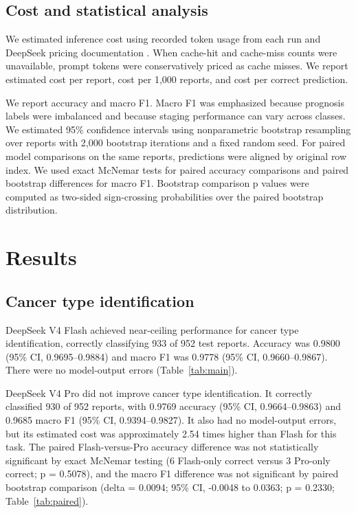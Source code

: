 \documentclass[pdflatex,sn-vancouver-num]{sn-jnl}
\begin{document}
\subsection{Cost and statistical analysis}\label{subsec:stats}

We estimated inference cost using recorded token usage from each run and DeepSeek pricing documentation \cite{deepseekpricing}. When cache-hit and cache-miss counts were unavailable, prompt tokens were conservatively priced as cache misses. We report estimated cost per report, cost per 1,000 reports, and cost per correct prediction.

We report accuracy and macro F1. Macro F1 was emphasized because prognosis labels were imbalanced and because staging performance can vary across classes. We estimated 95\% confidence intervals using nonparametric bootstrap resampling over reports with 2,000 bootstrap iterations and a fixed random seed. For paired model comparisons on the same reports, predictions were aligned by original row index. We used exact McNemar tests for paired accuracy comparisons and paired bootstrap differences for macro F1. Bootstrap comparison p values were computed as two-sided sign-crossing probabilities over the paired bootstrap distribution.

\section{Results}\label{sec:results}

\subsection{Cancer type identification}\label{subsec:cancerresults}

DeepSeek V4 Flash achieved near-ceiling performance for cancer type identification, correctly classifying 933 of 952 test reports. Accuracy was 0.9800 (95\% CI, 0.9695--0.9884) and macro F1 was 0.9778 (95\% CI, 0.9660--0.9867). There were no model-output errors (Table~\ref{tab:main}).

DeepSeek V4 Pro did not improve cancer type identification. It correctly classified 930 of 952 reports, with 0.9769 accuracy (95\% CI, 0.9664--0.9863) and 0.9685 macro F1 (95\% CI, 0.9394--0.9827). It also had no model-output errors, but its estimated cost was approximately 2.54 times higher than Flash for this task. The paired Flash-versus-Pro accuracy difference was not statistically significant by exact McNemar testing (6 Flash-only correct versus 3 Pro-only correct; p = 0.5078), and the macro F1 difference was not significant by paired bootstrap comparison (delta = 0.0094; 95\% CI, -0.0048 to 0.0363; p = 0.2330; Table~\ref{tab:paired}).
\end{document}
